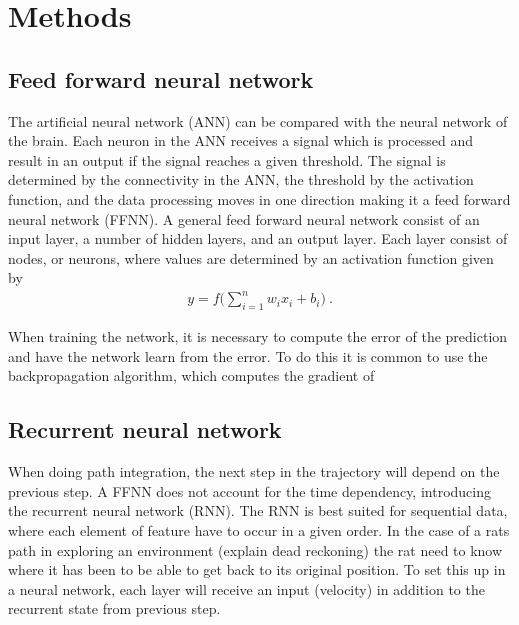 \section{Methods}\label{sec:methods}
\subsection{Feed forward neural network}\label{sssec:ffnn}
The artificial neural network (ANN) can be compared with the neural network of the brain. Each neuron in the ANN receives a signal which is processed and result in an output if the signal reaches a given threshold. The signal is determined by the connectivity in the ANN, the threshold by the activation function, and the data processing moves in one direction making it a feed forward neural network (FFNN).
A general feed forward neural network consist of an input layer, a number of hidden layers, and an output layer. Each layer consist of nodes, or neurons, where values are determined by an activation function given by 
\begin{align}
    y = f \bigg( \sum_{i=1}^{n} w_{i} x_{i} + b_{i} \bigg) \ .
\end{align}

When training the network, it is necessary to compute the error of the prediction and have the network learn from the error. To do this it is common to use the backpropagation algorithm, which computes the gradient of 

\subsection{Recurrent neural network}\label{sssec:rnn}
When doing path integration, the next step in the trajectory will depend on the previous step. A FFNN does not account for the time dependency, introducing the recurrent neural network (RNN). The RNN is best suited for sequential data, where each element of feature have to occur in a given order. In the case of a rats path in exploring an environment (explain dead reckoning) the rat need to know where it has been to be able to get back to its original position. To set this up in a neural network, each layer will receive an input (velocity) in addition to the recurrent state from previous step.

